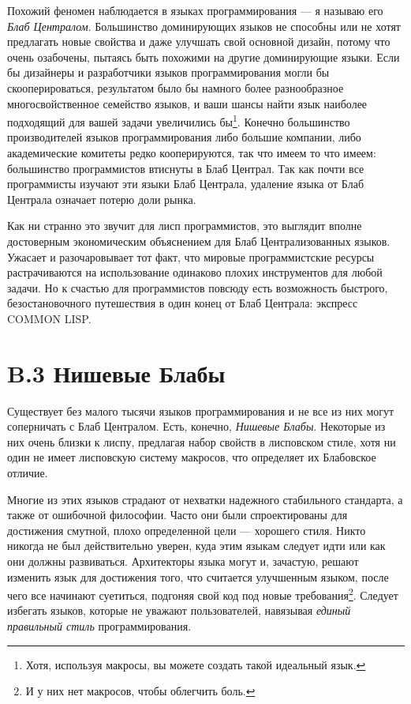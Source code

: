Похожий феномен наблюдается в языках программирования --- я называю его \emph{Блаб Централом}. Большинство доминирующих языков не способны или не хотят предлагать новые свойства и даже улучшать свой основной дизайн, потому что очень озабочены, пытаясь быть похожими на другие доминирующие языки. Если бы дизайнеры и разработчики языков программирования могли бы скооперироваться, результатом было бы намного более разнообразное многосвойственное семейство языков, и ваши шансы найти язык наиболее подходящий для вашей задачи увеличились бы\footnote[1]{Хотя, используя макросы, вы можете создать такой идеальный язык.}. Конечно большинство производителей языков программирования либо большие компании, либо академические комитеты редко кооперируются, так что имеем то что имеем: большинство программистов втиснуты в Блаб Централ. Так как почти все программисты изучают эти языки Блаб Централа, удаление языка от Блаб Централа означает потерю доли рынка.

Как ни странно это звучит для лисп программистов, это выглядит вполне достоверным экономическим объяснением для Блаб Централизованных языков. Ужасает и разочаровывает тот факт, что мировые программистские ресурсы растрачиваются на использование одинаково плохих инструментов для любой задачи. Но к счастью для программистов повсюду есть возможность быстрого, безостановочного путешествия в один конец от Блаб Централа: экспресс COMMON LISP.

\section*{B.3 Нишевые Блабы}

Существует без малого тысячи языков программирования и не все из них могут соперничать с Блаб Централом. Есть, конечно, \emph{Нишевые Блабы}. Некоторые из них очень близки к лиспу, предлагая набор свойств в лисповском стиле, хотя ни один не имеет лисповскую систему макросов, что определяет их Блабовское отличие.

Многие из этих языков страдают от нехватки надежного стабильного стандарта, а также от ошибочной философии. Часто они были спроектированы для достижения смутной, плохо определенной цели --- хорошего стиля. Никто никогда не был действительно уверен, куда этим языкам следует идти или как они должны развиваться. Архитекторы языка могут и, зачастую, решают изменить язык для достижения того, что считается улучшенным языком, после чего все начинают суетиться, подгоняя свой код под новые требования\footnote[2]{И у них нет макросов, чтобы облегчить боль.}. Следует избегать языков, которые не уважают пользователей, навязывая \emph{единый правильный стиль} программирования.

